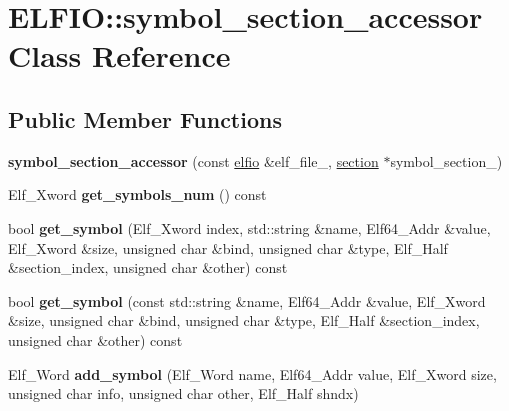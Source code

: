 \hypertarget{class_e_l_f_i_o_1_1symbol__section__accessor}{}\section{E\+L\+F\+IO\+:\+:symbol\+\_\+section\+\_\+accessor Class Reference}
\label{class_e_l_f_i_o_1_1symbol__section__accessor}
\subsection*{Public Member Functions}
\begin{DoxyCompactItemize}
\item 
{\bfseries symbol\+\_\+section\+\_\+accessor} (const \hyperlink{class_e_l_f_i_o_1_1elfio}{elfio} \&elf\+\_\+file\+\_\+, \hyperlink{class_e_l_f_i_o_1_1section}{section} $\ast$symbol\+\_\+section\+\_\+)\hypertarget{class_e_l_f_i_o_1_1symbol__section__accessor_ac31279955d20fd7afd28425a5f405ce9}{}\label{class_e_l_f_i_o_1_1symbol__section__accessor_ac31279955d20fd7afd28425a5f405ce9}

\item 
Elf\+\_\+\+Xword {\bfseries get\+\_\+symbols\+\_\+num} () const \hypertarget{class_e_l_f_i_o_1_1symbol__section__accessor_aea9697f3f01b0406a7832f99c31ce8b3}{}\label{class_e_l_f_i_o_1_1symbol__section__accessor_aea9697f3f01b0406a7832f99c31ce8b3}

\item 
bool {\bfseries get\+\_\+symbol} (Elf\+\_\+\+Xword index, std\+::string \&name, Elf64\+\_\+\+Addr \&value, Elf\+\_\+\+Xword \&size, unsigned char \&bind, unsigned char \&type, Elf\+\_\+\+Half \&section\+\_\+index, unsigned char \&other) const \hypertarget{class_e_l_f_i_o_1_1symbol__section__accessor_a073e7ac88181aefa032c2fb94040e8d4}{}\label{class_e_l_f_i_o_1_1symbol__section__accessor_a073e7ac88181aefa032c2fb94040e8d4}

\item 
bool {\bfseries get\+\_\+symbol} (const std\+::string \&name, Elf64\+\_\+\+Addr \&value, Elf\+\_\+\+Xword \&size, unsigned char \&bind, unsigned char \&type, Elf\+\_\+\+Half \&section\+\_\+index, unsigned char \&other) const \hypertarget{class_e_l_f_i_o_1_1symbol__section__accessor_a3a20264bd2a82fc73c58e1d81af3bc56}{}\label{class_e_l_f_i_o_1_1symbol__section__accessor_a3a20264bd2a82fc73c58e1d81af3bc56}

\item 
Elf\+\_\+\+Word {\bfseries add\+\_\+symbol} (Elf\+\_\+\+Word name, Elf64\+\_\+\+Addr value, Elf\+\_\+\+Xword size, unsigned char info, unsigned char other, Elf\+\_\+\+Half shndx)\hypertarget{class_e_l_f_i_o_1_1symbol__section__accessor_a7074d741caec30e274fb0696bca95735}{}\label{class_e_l_f_i_o_1_1symbol__section__accessor_a7074d741caec30e274fb0696bca95735}


\end{DoxyCompactItemize}
